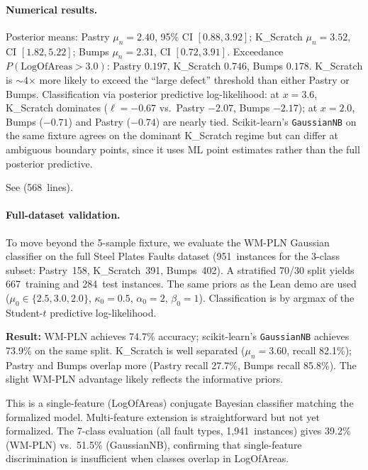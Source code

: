 \documentclass[11pt,openany]{report}
\begin{document}
\paragraph{Numerical results.}
Posterior means: Pastry $\mu_n = 2.40$, 95\% CI $[0.88, 3.92]$;
K\_Scratch $\mu_n = 3.52$, CI $[1.82, 5.22]$;
Bumps $\mu_n = 2.31$, CI $[0.72, 3.91]$.
Exceedance $P(\mathrm{LogOfAreas} > 3.0)$: Pastry $0.197$,
K\_Scratch $\mathbf{0.746}$, Bumps $0.178$.  K\_Scratch is
$\sim$4$\times$ more likely to exceed the ``large defect'' threshold
than either Pastry or Bumps.
Classification via posterior predictive log-likelihood:
at $x = 3.6$, K\_Scratch dominates ($\ell = -0.67$ vs.\ Pastry
$-2.07$, Bumps $-2.17$); at $x = 2.0$, Bumps ($-0.71$) and Pastry
($-0.74$) are nearly tied.  Scikit-learn's \texttt{GaussianNB} on
the same fixture agrees on the dominant K\_Scratch regime but can
differ at ambiguous boundary points, since it uses ML point estimates
rather than the full posterior predictive.

See  (568~lines).

\paragraph{Full-dataset validation.}
\label{sec:steel-full}
To move beyond the 5-sample fixture, we evaluate the WM-PLN Gaussian
classifier on the full Steel Plates Faults dataset (951~instances for
the 3-class subset: Pastry~158, K\_Scratch~391, Bumps~402).
A stratified 70/30 split yields 667~training and 284~test instances.
The same priors as the Lean demo are used ($\mu_0 \in \{2.5, 3.0, 2.0\}$,
$\kappa_0 = 0.5$, $\alpha_0 = 2$, $\beta_0 = 1$).
Classification is by argmax of the Student-$t$ predictive log-likelihood.

\textbf{Result:} WM-PLN achieves 74.7\% accuracy; scikit-learn's
\texttt{GaussianNB} achieves 73.9\% on the same split.
K\_Scratch is well separated ($\mu_n = 3.60$, recall 82.1\%);
Pastry and Bumps overlap more (Pastry recall 27.7\%, Bumps recall 85.8\%).
The slight WM-PLN advantage likely reflects the informative priors.

This is a single-feature (LogOfAreas) conjugate Bayesian classifier
matching the formalized model.  Multi-feature extension is straightforward
but not yet formalized.  The 7-class evaluation (all fault types, 1,941~instances)
gives 39.2\% (WM-PLN) vs.\ 51.5\% (GaussianNB), confirming that single-feature
discrimination is insufficient when classes overlap in LogOfAreas.
\end{document}
